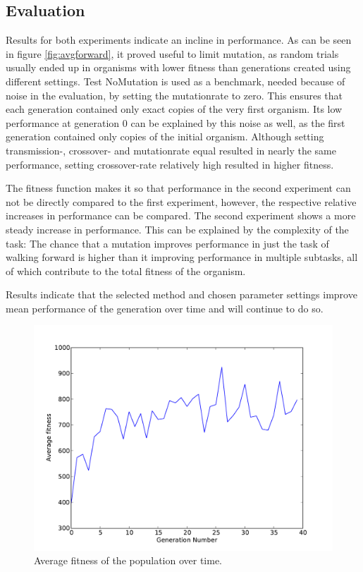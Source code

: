\documentclass{article}
\begin{document}
\subsection{Evaluation}
Results for both experiments indicate an incline in performance. As can be seen in figure \ref{fig:avgforward}, it proved useful to limit mutation, as random trials usually ended up in organisms with lower fitness than generations created using different settings. Test NoMutation is used as a benchmark, needed because of noise in the evaluation, by setting the mutationrate to zero. This ensures that each generation contained only exact copies of the very first organism. Its low performance at generation 0 can be explained by this noise as well, as the first generation contained only copies of the initial organism. Although setting transmission-, crossover- and mutationrate equal resulted in nearly the same performance, setting crossover-rate relatively high resulted in higher fitness. 

The fitness function makes it so that performance in the second experiment can not be directly compared to the first experiment, however, the respective relative increases in performance can be compared. The second experiment shows a more steady increase in performance. This can be explained by the complexity of the task: The chance that a mutation improves performance in just the task of walking forward is higher than it improving performance in multiple subtasks, all of which contribute to the total fitness of the organism. 

Results indicate that the selected method and chosen parameter settings improve mean performance of the generation over time and will continue to do so. 
\begin{figure}[h!]
	\center
	\includegraphics[width=.8\textwidth]{images/fitness}
	\caption{Average fitness of the population over time.}
	\label{fig:avg}
\end{figure}
\end{document}
